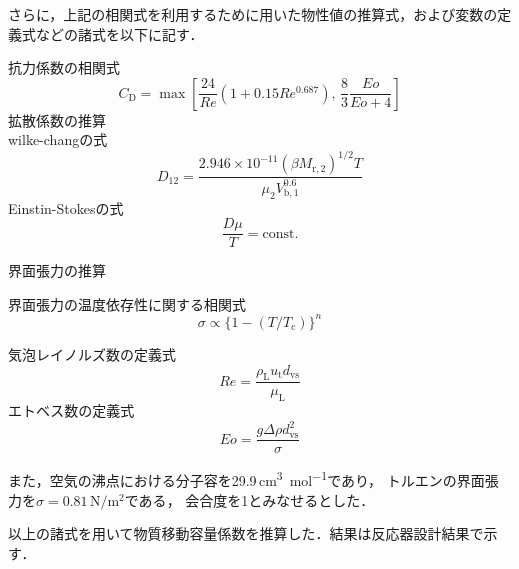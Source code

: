 \documentclass[a4j]{jsreport}
\begin{document}
さらに，上記の相関式を利用するために用いた物性値の推算式，および変数の定義式などの諸式を以下に記す．

\noindent 抗力係数の相関式\cite{19952357}
\begin{equation}
    C_\mathrm{D} = \max \left[ \frac{24}{Re}(1+0.15Re^{0.687}), \, \frac{8}{3} \frac{Eo}{Eo+4} \right]
\end{equation}
拡散係数の推算\\
wilke-changの式\cite{wilke}
\begin{equation}
    D_{12} = \frac{2.946\times 10^{-11}(\beta M_{\mathrm{r,2}})^{1/2} T} {\mu_2 V_{\mathrm{b},1}^{0.6}}
\end{equation}
Einstin-Stokesの式\cite{実験テキスト}
\begin{equation}
    \frac{D \mu}{T} = \text{const.}
\end{equation}

\noindent 界面張力の推算

\noindent 界面張力の温度依存性に関する相関式\cite{化工便覧}
\begin{equation}
    \sigma \propto \{ 1-(T/T_\mathrm{c}) \}^n
\end{equation}

\noindent 気泡レイノルズ数の定義式\cite{19952357}
\begin{equation}
    Re = \frac{\rho_\mathrm{L}u_\mathrm{t} d_\mathrm{vs}}{\mu_\mathrm{L}}
\end{equation}
\noindent エトベス数の定義式\cite{19952357}
\begin{equation}
    Eo = \frac{g \varDelta \rho d_\mathrm{vs}^2}{\sigma}
\end{equation}

また，空気の沸点における分子容を29.9\,\si{\cubic \centi \metre \per \mole}であり\cite{化工便覧}，
トルエンの界面張力を$\sigma=0.81 \,\si{\newton \per \metre \squared}$である\cite{界面張力}，
会合度を1とみなせるとした\cite{TPP}．

以上の諸式を用いて物質移動容量係数を推算した．結果は反応器設計結果で示す．
\end{document}
